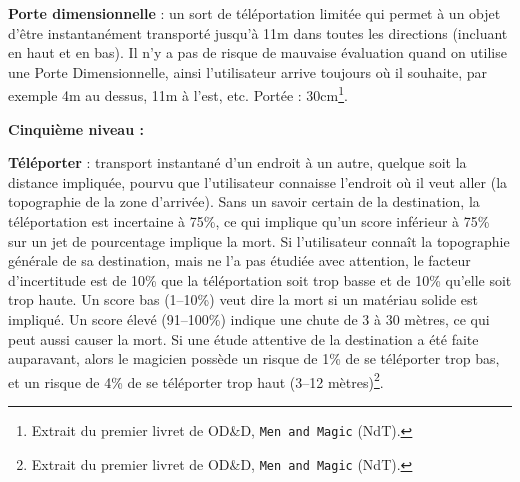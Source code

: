 \label{sort-porte-dimensionnelle}\textbf{Porte dimensionnelle} : un sort de téléportation limitée qui permet à un objet d'être instantanément transporté jusqu'à 11m dans toutes les directions (incluant en haut et en bas). Il n'y a pas de risque de mauvaise évaluation quand on utilise une Porte Dimensionnelle, ainsi l'utilisateur arrive toujours où il souhaite, par exemple 4m au dessus, 11m à l'est, etc. Portée : 30cm\footnote{Extrait du premier livret de OD\&D, \texttt{Men and Magic} (NdT).}.

\bigskip

\textbf{Cinquième niveau :}

\bigskip

\label{sort-teleporter}\textbf{Téléporter} : transport instantané d'un endroit à un autre, quelque soit la distance impliquée, pourvu que l'utilisateur connaisse l'endroit où il veut aller (la topographie de la zone d'arrivée). Sans un savoir certain de la destination, la téléportation est incertaine à 75\%, ce qui implique qu'un score inférieur à 75\% sur un jet de pourcentage implique la mort. Si l'utilisateur connaît la topographie générale de sa destination, mais ne l'a pas étudiée avec attention, le facteur d'incertitude est de 10\% que la téléportation soit trop basse et de 10\% qu'elle soit trop haute. Un score bas (1--10\%) veut dire la mort si un matériau solide est impliqué. Un score élevé (91--100\%) indique une chute de 3 à 30 mètres, ce qui peut aussi causer la mort. Si une étude attentive de la destination a été faite auparavant, alors le magicien possède un risque de 1\% de se téléporter trop bas, et un risque de 4\% de se téléporter trop haut (3--12 mètres)\footnote{Extrait du premier livret de OD\&D, \texttt{Men and Magic} (NdT).}.

\bigskip

